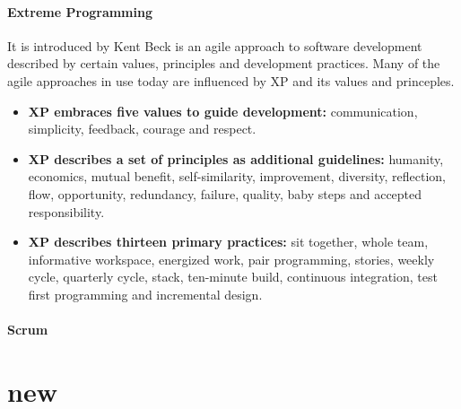 \documentclass[12pt,a4paper,violet]{bbe}
\begin{document}
\subsubsection{Extreme Programming}
It is introduced by Kent Beck is an agile approach to software development described by certain values, principles and development practices. Many of the agile approaches in use today are influenced by XP and its values and princeples. \\
\begin{itemize}
    \item \textbf{XP embraces five values to guide development:} communication, simplicity, feedback, courage and respect.
    \item \textbf{XP describes  a set of principles as additional guidelines:} humanity, economics, mutual benefit,  self-similarity, improvement, diversity, reflection, flow, opportunity, redundancy, failure, quality, baby steps and accepted responsibility.
    \item \textbf{XP describes thirteen primary practices:} sit together, whole team, informative workspace, energized work, pair programming, stories, weekly cycle, quarterly cycle, stack, ten-minute build, continuous integration, test first programming and incremental design.
\end{itemize}
\subsubsection{Scrum}
\chapter{new}
\end{document}
